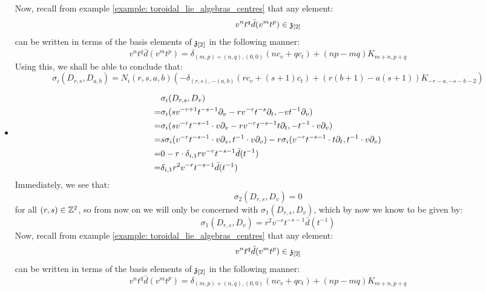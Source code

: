 \begin{example}
\begin{itemize}
                Now, recall from example \ref{example: toroidal_lie_algebras_centres} that any element:
                    $$v^n t^q \bar{d}(v^m t^p) \in \mathfrak{z}_{[2]}$$
                can be written in terms of the basis elements of $\mathfrak{z}_{[2]}$ in the following manner:
                    $$v^n t^q \bar{d}(v^m t^p) = \delta_{(m, p) + (n, q), (0, 0)} ( n c_v + q c_t ) + (np - mq) K_{m + n, p + q}$$
                Using this, we shall be able to conclude that:
                    $$\sigma_i(D_{r, s}, D_{a, b}) = N_i(r, s, a, b) \left( -\delta_{(r, s), -(a, b)} (r c_v + (s + 1) c_t) + ( r(b + 1) - a(s + 1) )K_{-r - a, -s - b - 2} \right)$$
                \item
                    $$
                        \begin{aligned}
                            & \sigma_i(D_{r, s}, D_v)
                            \\
                            = & \sigma_i( s v^{-r + 1} t^{-s - 1} \partial_v - r v^{-r} t^{-s} \partial_t, -v t^{-1} \partial_v )
                            \\
                            = & \sigma_i( s v^{-r} t^{-s - 1} \cdot v \partial_v - r v^{-r} t^{-s - 1} t \partial_t, -t^{-1} \cdot v \partial_v )
                            \\
                            = & s \sigma_i( v^{-r} t^{-s - 1} \cdot v \partial_v, t^{-1} \cdot v \partial_v ) - r\sigma_i( v^{-r} t^{-s - 1} \cdot t \partial_t, t^{-1} \cdot v \partial_v )
                            \\
                            = & 0 - r \cdot \delta_{i, 1}r v^{-r} t^{-s - 1} \bar{d}(t^{-1})
                            \\
                            = & \delta_{i, 1} r^2 v^{-r} t^{-s - 1} \bar{d}(t^{-1})
                        \end{aligned}
                    $$
                Immediately, we see that:
                    $$\sigma_2(D_{r, s}, D_v) = 0$$
                for all $(r, s) \in \mathbb{Z}^2$, so from now on we will only be concerned with $\sigma_1(D_{r, s}, D_v)$, which by now we know to be given by:
                    $$\sigma_1(D_{r, s}, D_v) = r^2 v^{-r} t^{-s - 1} \bar{d}(t^{-1})$$
                Now, recall from example \ref{example: toroidal_lie_algebras_centres} that any element:
                    $$v^n t^q \bar{d}(v^m t^p) \in \mathfrak{z}_{[2]}$$
                can be written in terms of the basis elements of $\mathfrak{z}_{[2]}$ in the following manner:
                    $$v^n t^q \bar{d}(v^m t^p) = \delta_{(m, p) + (n, q), (0, 0)} ( n c_v + q c_t ) + (np - mq) K_{m + n, p + q}$$

\end{itemize}
\end{example}
